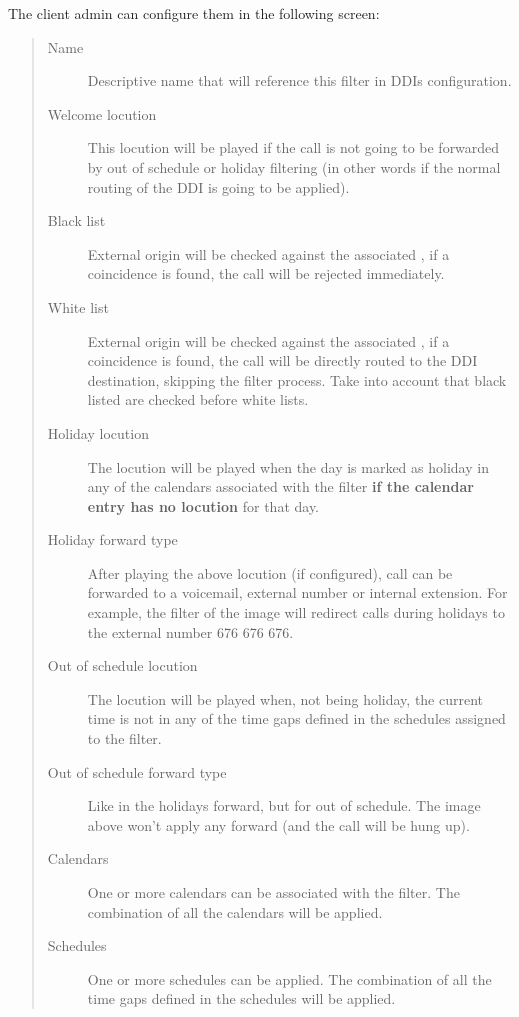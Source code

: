 \documentclass[letterpaper,10pt,spanish]{sphinxmanual}
\begin{document}
The client admin can configure them in the following screen:
\begin{quote}
\begin{description}
\item[{Name}] \leavevmode
Descriptive name that will reference this filter in DDIs configuration.

\item[{Welcome locution}] \leavevmode
This locution will be played if the call is not going to be
forwarded by out of schedule or holiday filtering (in other words if
the normal routing of the DDI is going to be applied).

\item[{Black list}] \leavevmode
External origin will be checked against the associated {\hyperref[administration_portal/client/vpbx/routing_tools/match_lists:match\string-lists]{}},
if a coincidence is found, the call will be rejected immediately.

\item[{White list}] \leavevmode
External origin will be checked against the associated {\hyperref[administration_portal/client/vpbx/routing_tools/match_lists:match\string-lists]{}},
if a coincidence is found, the call will be directly routed to the DDI
destination, skipping the filter process. Take into account that black
listed are checked before white lists.

\item[{Holiday locution}] \leavevmode
The locution will be  played when the day is marked as holiday in any
of the calendars associated with the filter \textbf{if the calendar entry has
no locution} for that day.

\item[{Holiday forward type}] \leavevmode
After playing the above locution (if configured), call can be forwarded
to a voicemail, external number or internal extension. For example, the
filter of the image will redirect calls during holidays to the external
number 676 676 676.

\item[{Out of schedule locution}] \leavevmode
The locution will be played when, not being holiday, the current time
is not in any of the time gaps defined in the schedules assigned to the
filter.

\item[{Out of schedule forward type}] \leavevmode
Like in the holidays forward, but for out of schedule. The image above
won't apply any forward (and the call will be hung up).

\item[{Calendars}] \leavevmode
One or more calendars can be associated with the filter. The combination
of all the calendars will be applied.

\item[{Schedules}] \leavevmode
One or more schedules can be applied. The combination of all the time
gaps defined in the schedules will be applied.

\end{description}
\end{quote}
\end{document}

